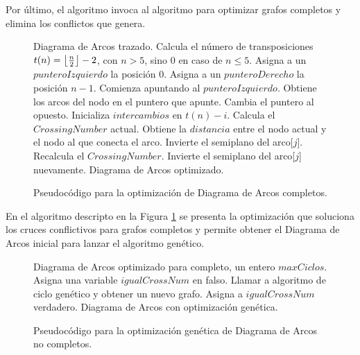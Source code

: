 	Por último, el algoritmo invoca al algoritmo para optimizar grafos completos y elimina  los conflictos que genera.
	\begin{figure}
	    \begin{center}
		\begin{algorithmic}[1]
			\REQUIRE Diagrama de Arcos trazado.
			\STATE Calcula el número de transposiciones $t(n) = \floor*{\frac{n}{2}}-2$, con $n > 5$, sino $0$ en caso de $n \leq 5$.
			\STATE Asigna a un $punteroIzquierdo$ la posición 0.
			\STATE Asigna a un $punteroDerecho$ la posición $n-1$.
			\STATE Comienza apuntando al $punteroIzquierdo$.
			\STATE Obtiene los arcos del nodo en el puntero que apunte.
			\STATE Cambia el puntero al opuesto.
			\STATE Inicializa $intercambios$ en $t(n)-i$.
			\STATE Calcula el $CrossingNumber$ actual.
			\STATE Obtiene la $distancia$ entre el nodo actual y el nodo al que conecta el arco.
			\STATE Invierte el semiplano del arco[$j$].
			\STATE Recalcula el $CrossingNumber$.
			\STATE Invierte el semiplano del arco[$j$] nuevamente.
			\ENDIF
			\ENDIF
			\ENDWHILE
			\ENDFOR
			\ENSURE Diagrama de Arcos optimizado.
		\end{algorithmic}
	    \end{center}

		\caption{Pseudocódigo para la optimización de Diagrama de Arcos completos.}
		\label{alg:arcdiagram_optimizado}
	\end{figure}
	En el algoritmo descripto en la Figura \ref{alg:arcdiagram_optimizado} se presenta la optimización que soluciona los cruces conflictivos para grafos completos y permite obtener el Diagrama de Arcos inicial para lanzar el algoritmo genético.
	\begin{figure}	
	    \begin{center}
		\begin{algorithmic}[1]
			\REQUIRE Diagrama de Arcos optimizado para completo, un entero $maxCiclos$.
			\STATE Asigna una variable $igualCrossNum$ en falso.
			\STATE Llamar a algoritmo de ciclo genético y obtener un nuevo grafo.
			\STATE Asigna a $igualCrossNum$ verdadero.
			\ENDIF
			\ENDWHILE
			\ENSURE Diagrama de Arcos con optimización genética.
		\end{algorithmic}
	    \end{center}

		\caption{Pseudocódigo para la optimización genética de Diagrama de Arcos no completos.}
		\label{alg:genetico}
	\end{figure}
	
